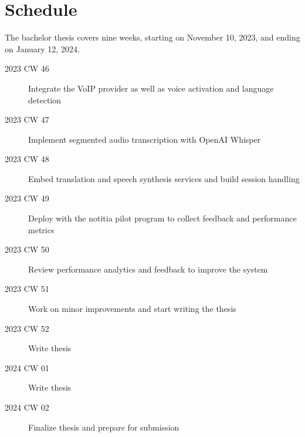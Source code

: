 \documentclass[a4paper,10pt]{article}
\begin{document}
\section{Schedule}
The bachelor thesis covers nine weeks, starting on November 10, 2023, and ending on January 12, 2024.
\begin{description}
  \item[2023 CW 46] Integrate the VoIP provider as well as voice activation and language detection
  \item[2023 CW 47] Implement segmented audio transcription with OpenAI Whisper
  \item[2023 CW 48] Embed translation and speech synthesis services and build session handling
  \item[2023 CW 49] Deploy with the notitia pilot program to collect feedback and performance metrics
  \item[2023 CW 50] Review performance analytics and feedback to improve the system
  \item[2023 CW 51] Work on minor improvements and start writing the thesis
  \item[2023 CW 52] Write thesis
  \item[2024 CW 01] Write thesis
  \item[2024 CW 02] Finalize thesis and prepare for submission
\end{description}


% 
% 
\end{document}
